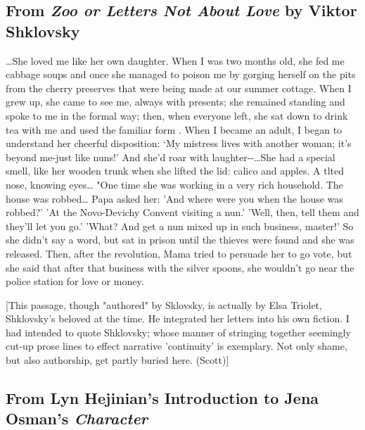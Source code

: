 \documentclass[
]{memoir}
\begin{document}
\hypertarget{from-zoo-or-letters-not-about-love-by-viktor-shklovsky}{%
\subsection*{\texorpdfstring{From \emph{Zoo or Letters Not About Love}
by Viktor
Shklovsky}{From Zoo or Letters Not About Love by Viktor Shklovsky}}\label{from-zoo-or-letters-not-about-love-by-viktor-shklovsky}}

\ldots{}She loved me like her own daughter. When I was two months old,
she fed me cabbage soups and once she managed to poison me by gorging
herself on the pits from the cherry preserves that were being made at
our summer cottage. When I grew up, she came to see me, always with
presents; she remained standing and spoke to me in the formal way; then,
when everyone left, she sat down to drink tea with me and used the
familiar form . When I became an adult, I began to understand her
cheerful disposition: `My mistress lives with another woman; it's beyond
me-just like nuns!' And she'd roar with laughter-\/-\ldots{}She had a
special smell, like her wooden trunk when she lifted the lid: calico and
apples. A tlted nose, knowing eyes\ldots{} "One time she was working in
a very rich household. The house was robbed\ldots{} Papa asked her: 'And
where were you when the house was robbed?' 'At the Novo-Devichy Convent
visiting a nun.' 'Well, then, tell them and they'll let you go.' 'What?
And get a nun mixed up in such business, master!' So she didn't say a
word, but sat in prison until the thieves were found and she was
released. Then, after the revolution, Mama tried to persuade her to go
vote, but she said that after that business with the silver spoons, she
wouldn't go near the police station for love or money.

{[}This passage, though "authored" by Sklovsky, is actually by Elsa
Triolet, Shklovsky's beloved at the time. He integrated her letters into
his own fiction. I had intended to quote Shklovsky; whose manner of
stringing together seemingly cut-up prose lines to effect narrative
'continuity' is exemplary. Not only shame, but also authorship, get
partly buried here. (Scott){]}

\hypertarget{from-lyn-hejinians-introduction-to-jena-osmans-character}{%
\subsection*{\texorpdfstring{From Lyn Hejinian's Introduction to Jena
Osman's
\emph{Character}}{From Lyn Hejinian's Introduction to Jena Osman's Character}}\label{from-lyn-hejinians-introduction-to-jena-osmans-character}}
\end{document}
